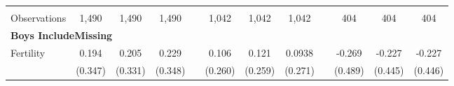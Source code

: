\begin{landscape}
\begin{table}[htpb!]
\begin{center}
\begin{tabular}{lcccp{2mm}cccp{2mm}ccc}
\begin{footnotesize}\end{footnotesize}&\begin{footnotesize}\end{footnotesize}&\begin{footnotesize}\end{footnotesize}&\begin{footnotesize}\end{footnotesize}&\begin{footnotesize}\end{footnotesize}&\begin{footnotesize}\end{footnotesize}&\begin{footnotesize}\end{footnotesize}&\begin{footnotesize}\end{footnotesize}&\begin{footnotesize}\end{footnotesize}&\begin{footnotesize}\end{footnotesize}&\begin{footnotesize}\end{footnotesize}&\begin{footnotesize}\end{footnotesize}\\Observations&1,490&1,490&1,490&&1,042&1,042&1,042&&404&404&404\\
\multicolumn{12}{l}{\textbf{Boys IncludeMissing}}\\ 
Fertility&0.194&0.205&0.229&&0.106&0.121&0.0938&&-0.269&-0.227&-0.227\\
&(0.347)&(0.331)&(0.348)&&(0.260)&(0.259)&(0.271)&&(0.489)&(0.445)&(0.446)\\

\end{tabular}
\end{center}
\end{table}
\end{landscape}
